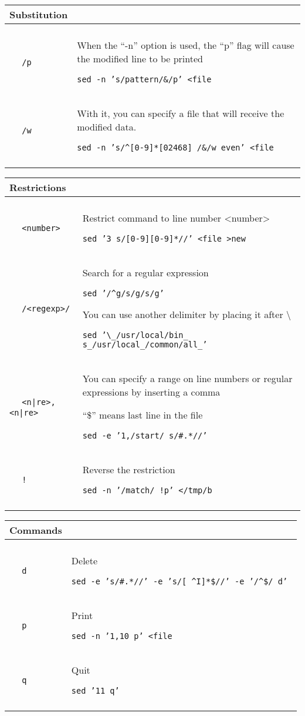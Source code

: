 \documentclass[a4paper,10pt,landscape,twocolumn]{article}
\newcommand{\commanddescr}[2]{\small ~~ \texttt{#1} & \small #2 \smallskip \\ }
\newenvironment{mycommands}[1]
               { \begin{tabular}{lp{9cm}} \\
                   \large{\textbf{#1}} \medskip \\ \hline \\}
               { \\ \hline \end{tabular} \medskip }
\newcommand{\sedex}[1]{\textcolor[gray]{0.40}{\texttt{#1}}}
\begin{document}
\begin{mycommands}{Substitution}

  \commanddescr{/p}{
    When the ``-n'' option is used, the ``p'' flag will 
    cause the modified line to be printed

    \sedex{sed -n 's/pattern/\&{}/p' <file}
  }
  
  \commanddescr{/w}{
    With it, you can specify a file that will receive the modified data.

    \sedex{sed -n 's/\^{}[0-9]*[02468] /\&{}/w even' <file }
  }

\end{mycommands}

\begin{mycommands}{Restrictions}
  
  \commanddescr{<number>}{
    Restrict command to line number <number>

    \sedex{sed '3 s/[0-9][0-9]*//' <file >new}
  }

  \commanddescr{/<regexp>/}{
    Search for a regular expression 

    \sedex{sed '/\^{}g/s/g/s/g'}

    You can use another delimiter by placing it after \textbackslash{}

    \sedex{sed '\textbackslash{}\_{}/usr/local/bin\_{} s\_{}/usr/local\_{}/common/all\_{}'}
  }

  \commanddescr{<n|re>,<n|re>}{
    You can specify a range on line numbers or regular expressions 
    by inserting a comma
    
    ``\${}'' means last line in the file

    \sedex{sed -e '1,/start/ s/\#{}.*//'}
  }

  \commanddescr{!}{
    Reverse the restriction

    \sedex{sed -n '/match/ !p' </tmp/b}
  }

\end{mycommands}

\begin{mycommands}{Commands}
  
  \commanddescr{d}{
    Delete

    \sedex{sed -e 's/\#{}.*//' -e 's/[ \^{}I]*\${}//' -e '/\^{}\${}/ d' }
  }
  \commanddescr{p}{

    Print

    \sedex{sed -n '1,10 p' <file}

  }
  \commanddescr{q}{
    Quit

    \sedex{sed '11 q'}
  }

\end{mycommands}
\end{document}
